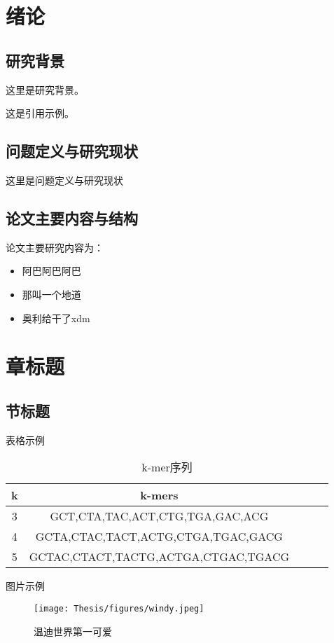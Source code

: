 
\iffalse
\fi

\chapter{绪论}

\section{研究背景}
这里是研究背景。

这是引用示例\cite{simon2011metagenomic}。

\section{问题定义与研究现状}
这里是问题定义与研究现状
\section{论文主要内容与结构}
\noindent
论文主要研究内容为：

\begin{itemize}
    \item 阿巴阿巴阿巴
    \item 那叫一个地道
    \item 奥利给干了xdm
\end{itemize}

\noindent

\chapter{章标题}
\section{节标题}
表格示例

\begin{table}[H]
\caption{k-mer序列}\label{tab:table1}
\vspace{0.5em}\centering\wuhao
\begin{tabular}{ccccc}
\toprule[1.5pt]
k & k-mers\\
\midrule[1pt]
3 & GCT,CTA,TAC,ACT,CTG,TGA,GAC,ACG     \\
4 & GCTA,CTAC,TACT,ACTG,CTGA,TGAC,GACG  \\
5 & GCTAC,CTACT,TACTG,ACTGA,CTGAC,TGACG \\
\bottomrule[1.5pt]
\end{tabular}
\vspace{\baselineskip}
\end{table}
图片示例
\begin{figure}[htb]
\centering
\texttt{[image: Thesis/figures/windy.jpeg]}
\caption{温迪世界第一可爱}\label{fig:k-mer1}
\vspace{2em}
\end{figure}
